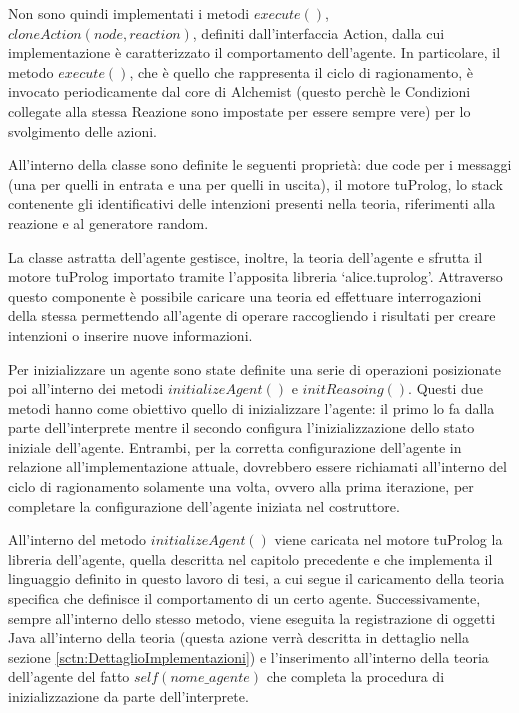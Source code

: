 Non sono quindi implementati i metodi $execute()$, $cloneAction(node, reaction)$, definiti dall'interfaccia Action, dalla cui implementazione è caratterizzato il comportamento dell'agente. In particolare, il metodo $execute()$, che è quello che rappresenta il ciclo di ragionamento, è invocato periodicamente dal core di Alchemist (questo perchè le Condizioni collegate alla stessa Reazione sono impostate per essere sempre vere) per lo svolgimento delle azioni.

All'interno della classe sono definite le seguenti proprietà: due code per i messaggi (una per quelli in entrata e una per quelli in uscita), il motore tuProlog, lo stack contenente gli identificativi delle intenzioni presenti nella teoria, riferimenti alla reazione e al generatore random.

La classe astratta dell'agente gestisce, inoltre, la teoria dell'agente e sfrutta il motore tuProlog importato tramite l'apposita libreria `alice.tuprolog'. Attraverso questo componente è possibile caricare una teoria ed effettuare interrogazioni della stessa permettendo all'agente di operare raccogliendo i risultati per creare intenzioni o inserire nuove informazioni.

Per inizializzare un agente sono state definite una serie di operazioni posizionate poi all'interno dei metodi $initializeAgent()$ e $initReasoing()$.
Questi due metodi hanno come obiettivo quello di inizializzare l'agente: il primo lo fa dalla parte dell'interprete mentre il secondo configura l'inizializzazione dello stato iniziale dell'agente.
Entrambi, per la corretta configurazione dell'agente in relazione all'implementazione attuale, dovrebbero essere richiamati all'interno del ciclo di ragionamento solamente una volta, ovvero alla prima iterazione, per completare la configurazione dell'agente iniziata nel costruttore.

All'interno del metodo $initializeAgent()$ viene caricata nel motore tuProlog la libreria dell'agente, quella descritta nel capitolo precedente e che implementa il linguaggio definito in questo lavoro di tesi, a cui segue il caricamento della teoria specifica che definisce il comportamento di un certo agente. Successivamente, sempre all'interno dello stesso metodo, viene eseguita la registrazione di oggetti Java all'interno della teoria (questa azione verrà descritta in dettaglio nella sezione \ref{sctn:DettaglioImplementazioni}) e l'inserimento all'interno della teoria dell'agente del fatto $self(nome\_agente)$ che completa la procedura di inizializzazione da parte dell'interprete.

